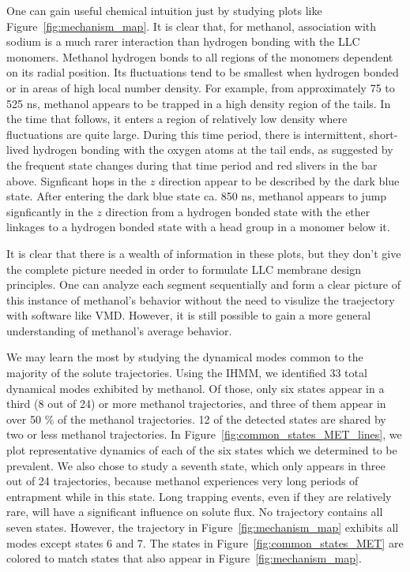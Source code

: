 \documentclass{article}
\begin{document}
  One can gain useful chemical intuition just by studying plots like
  Figure~\ref{fig:mechanism_map}. It is clear that, for methanol, association 
  with sodium is a much rarer interaction than hydrogen bonding with the 
  LLC monomers. Methanol hydrogen bonds to all regions of the monomers dependent
  on its radial position. Its fluctuations tend to be smallest when hydrogen bonded
  or in areas of high local number density. For example, from approximately 75 to 
  525 ns, methanol appears to be trapped in a high density region of the tails.
  In the time that follows, it enters a region of relatively low density where 
  fluctuations are quite large. During this time period, there is intermittent, 
  short-lived hydrogen bonding with the oxygen atoms at the tail ends, as suggested
  by the frequent state changes during that time period and red slivers in the bar
  above. Signficant hops in the $z$ direction appear to be described by the dark blue
  state. After entering the dark blue state ca. 850 ns, methanol appears to jump
  signficantly in the $z$ direction from a hydrogen bonded state with the ether 
  linkages to a hydrogen bonded state with a head group in a monomer below it.

  It is clear that there is a wealth of information in these plots, but they don't give
  the complete picture needed in order to formulate LLC membrane design principles. One
  can analyze each segment sequentially and form a clear picture of this instance of 
  methanol's behavior without the need to visulize the traejectory with software like VMD.
  However, it is still possible to gain a more general understanding of methanol's average
  behavior.
  
  We may learn the most by studying the dynamical modes common to the majority of 
  the solute trajectories. Using the IHMM, we identified 33 total dynamical modes 
  exhibited by methanol. Of those, only six states appear in a third (8 out of 24) 
  or more methanol trajectories, and three of them appear in over 50 \% of the 
  methanol trajectories. 12 of the detected states are shared by two or less 
  methanol trajectories. In Figure~\ref{fig:common_states_MET_lines}, we plot 
  representative dynamics of each of the six states which we determined to be prevalent.
  We also chose to study a seventh state, which only appears in three out of
  24 trajectories, because methanol experiences very long periods of entrapment
  while in this state. Long trapping events, even if they are relatively rare, will
  have a significant influence on solute flux. No trajectory contains all seven states.
  However, the trajectory in Figure~\ref{fig:mechanism_map} exhibits all modes except
  states 6 and 7. The states in Figure~\ref{fig:common_states_MET} are colored to match
  states that also appear in Figure~\ref{fig:mechanism_map}.
    
\end{document}
